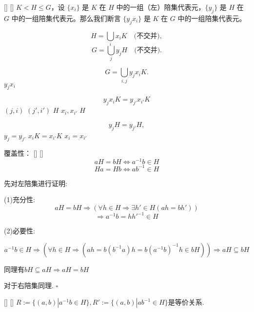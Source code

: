 \documentclass[UTF8]{ctexart}
\begin{document}
            \begin{ppt}
            []
            {}
            []
            []
			$K < H \leq G$，设 $\{x_i\}$ 是 $K$ 在 $H$ 中的一组（左）陪集代表元，$\{y_j\}$ 是 $H$ 在 $G$ 中的一组陪集代表元。那么我们断言 $\{y_jx_i\}$ 是 $K$ 在 $G$ 中的一组陪集代表元。
		\end{ppt}

		\begin{prf}
				\[H = \bigcup_i x_i K \quad \text{(不交并)}, \]
				\[G = \bigcup_j y_j H \quad \text{(不交并)}.\]


				$$
				G = \bigcup_{i, j} y_j x_i K.
				$$ 
				 $y_j x_i$ 

				$$
				y_j x_i K = y_{j'} x_{i'} K
				$$ 
				 $(j, i)$  $(j', i')$  $H$  $x_i, x_{i'}$  $H$ 

				$$
				y_j H = y_{j'} H,
				$$ 
				 $y_j = y_{j'}$  $x_i K = x_{i'} K$  $x_i = x_{i'}$ 

		\end{prf}
		
		\begin{ppt}
            []
            {覆盖性：}
            []
            []
			\[aH=bH\iff a^{-1}b\in H\]
			\[Ha=Hb\iff ab^{-1}\in H\]
		\end{ppt}
		 
	\begin{prf}		
			先对左陪集进行证明: 

			(1)充分性: 
			\[aH=bH\Longrightarrow(\forall h\in H\Longrightarrow\exists h'\in H(ah=bh'))\]
			\[\Longrightarrow a^{-1}b=hh'^{-1}\in H\]
			
			(2)必要性: 
			
			\[a^{-1}b\in H\Longrightarrow(\forall h\in H\Longrightarrow(ah=b(b^{-1}a)h=b(a^{-1}b)^{-1}h\in bH))\Longrightarrow aH\subseteq bH\]
			
			同理有$bH\subseteq aH\Longrightarrow aH=bH$
			
			对于右陪集同理. $\square$
		\end{prf}
  
		\begin{ppt}
            []
            {}
            []
            []
			$R:=\{(a,b)|a^{-1}b\in H\},R':=\{(a,b)|ab^{-1}\in H\}$是等价关系. 
		\end{ppt}
		
\end{document}
